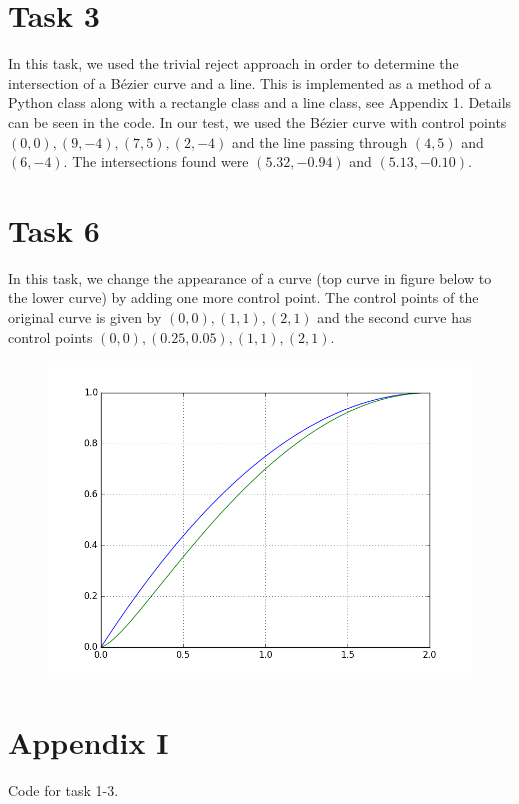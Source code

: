\documentclass[]{article}
\begin{document}
\section*{Task 3}
In this task, we used the trivial reject approach in order to determine the intersection of a B\'ezier curve and a line. This is implemented as a method of a Python class along with a rectangle class and a line class, see Appendix 1. Details can be seen in the code. In our test, we used the B\'ezier curve with control points $(0, 0), (9, -4), (7, 5), (2, -4)$ and the line passing through $(4, 5)$ and $(6, -4)$. The intersections found were $(5.32, -0.94)$ and $(5.13, -0.10)$.

\section*{Task 6}
In this task, we change the appearance of a curve (top curve in figure below to the lower curve) by adding one more control point. The control points of the original curve is given by $(0, 0), (1, 1), (2, 1)$ and the second curve has control points $(0, 0), (0.25, 0.05), (1, 1), (2, 1)$.

\begin{figure}[h!]
	\includegraphics[scale=0.6]{non_symmetric_degree_elevation}
\end{figure}

\newpage
\section*{Appendix I}
Code for task 1-3.

\end{document}
